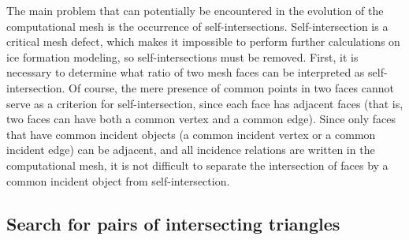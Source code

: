 \documentclass[
11pt,%
tightenlines,%
twoside,%
onecolumn,%
nofloats,%
nobibnotes,%
nofootinbib,%
superscriptaddress,%
noshowpacs,%
centertags]%
{revtex4-2}
\begin{document}
The main problem that can potentially be encountered in the evolution of the computational mesh is the occurrence of self-intersections.
Self-intersection is a critical mesh defect, which makes it impossible to perform further calculations on ice formation modeling, so self-intersections must be removed.
First, it is necessary to determine what ratio of two mesh faces can be interpreted as self-intersection.
Of course, the mere presence of common points in two faces cannot serve as a criterion for self-intersection, since each face has adjacent faces (that is, two faces can have both a common vertex and a common edge).
Since only faces that have common incident objects (a common incident vertex or a common incident edge) can be adjacent, and all incidence relations are written in the computational mesh, it is not difficult to separate the intersection of faces by a common incident object from self-intersection.

\subsection{Search for pairs of intersecting triangles}
\end{document}
